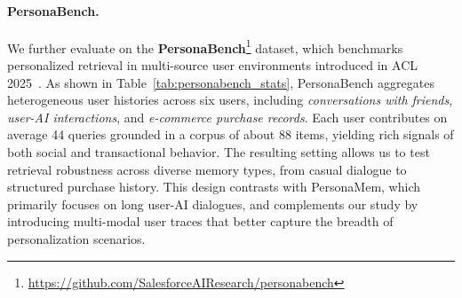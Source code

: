 \paragraph{PersonaBench.} 
We further evaluate on the \textbf{PersonaBench}\footnote{\url{https://github.com/SalesforceAIResearch/personabench}} dataset, which benchmarks personalized retrieval in multi-source user environments introduced in ACL 2025~\citep{tan2025personabench}. As shown in Table~\ref{tab:personabench_stats}, PersonaBench aggregates heterogeneous user histories across six users, including \emph{conversations with friends}, \emph{user-AI interactions}, and \emph{e-commerce purchase records}. Each user contributes on average 44 queries grounded in a corpus of about 88 items, yielding rich signals of both social and transactional behavior. The resulting setting allows us to test retrieval robustness across diverse memory types, from casual dialogue to structured purchase history.  
This design contrasts with PersonaMem, which primarily focuses on long user-AI dialogues, and complements our study by introducing multi-modal user traces that better capture the breadth of personalization scenarios. 

